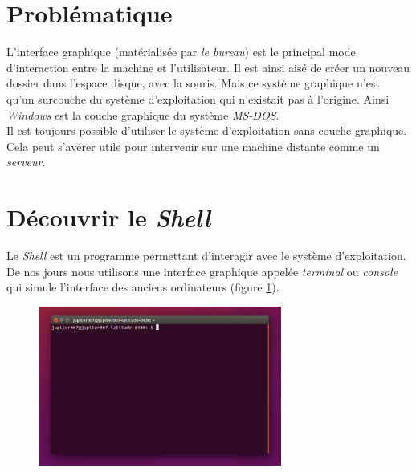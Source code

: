 \documentclass[a4paper,11pt]{article}
\begin{document}
\begin{Form}
\section{Problématique}
L'interface graphique (matérialisée par \emph{le bureau}) est le principal mode d'interaction entre la machine et l'utilisateur. Il est ainsi aisé de créer un nouveau dossier dans l'espace disque, avec la souris. Mais ce système graphique n'est qu'un surcouche du système d'exploitation qui n'existait pas à l'origine. Ainsi \emph{Windows} est la couche graphique du système \emph{MS-DOS}.\\
Il est toujours possible d'utiliser le système d'exploitation sans couche graphique. Cela peut s'avérer utile pour intervenir sur une machine distante comme un \emph{serveur}.
\begin{center}
\end{center}
\section{Découvrir le \emph{Shell}}
Le \emph{Shell} est un programme permettant d'interagir avec le système d'exploitation. De nos jours nous utilisons une interface graphique appelée \emph{terminal} ou \emph{console} qui simule l'interface des anciens ordinateurs (figure \ref{terminal}).
\begin{figure}[!h]
\centering
\includegraphics[width=8cm]{ressources/terminal.png}
\label{terminal}
\end{figure}


\end{Form}
\end{document}
